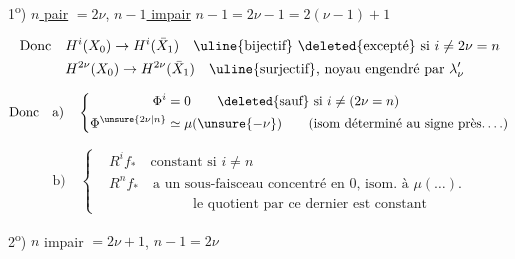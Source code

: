 1\textsuperscript{o}) \uline{$n$ pair} $=2\nu$, \uline{$n-1$ impair} \qquad $n-1=2\nu-1=2(\nu-1)+1$

\diagram{$\left.\begin{array}{ll}
 H^*(X_0):&1,\xi_0,\ldots,\xi_0^{\nu-1},[\xi_0^\nu,\lambda'_\nu],\frac12\xi_0^{\nu+1},\ldots\frac12\xi_0^{2\nu-1}\\[4pt]
 H^*(\bar X_1):&1,\xi_1\ldots,\xi_1^{\nu-1},\frac12\xi_1^\nu,\frac12\xi_1^{\nu+1},\ldots,\frac12\xi_1^{2\nu-1}
 \end{array}\right]\quad\begin{array}{l}\xi_0\leadsto\xi_1\\ \lambda'_\nu\leadsto0\end{array}$}

\[
\begin{aligned}
\text{Donc}\quad & H^i(X_0)\to H^i(\bar X_1)\quad\text{\uline{bijectif} \deleted{excepté} si }i\ne2\nu=n\\
& H^{2\nu}(X_0)\to H^{2\nu}(\bar X_1)\quad\text{\uline{surjectif}, noyau engendré par }\lambda'_\nu
\end{aligned}
\]

\[
\text{Donc}\quad\text{a)}\quad
\left\{\begin{aligned}
\Phi^{i}&=0\qquad \text{\deleted{sauf} si }i\ne(2\nu=n)\\
\Phi^{\unsure{2\nu|n}}&\simeq\mu(\unsure{-\nu})\qquad\text{(isom déterminé au signe près\ldots.)}
\end{aligned}\right.
\]

\[
\text{b)}\quad\left\{\begin{aligned}
&R^i f_*\quad\text{constant si }i\ne n\\
&R^n f_*\quad\text{a un sous-faisceau concentré en $0$, isom. à $\mu(\ldots)$.}\\
&\hspace{6em}\text{le quotient par ce dernier est constant}
\end{aligned}\right.
\]


2\textsuperscript{o}) $n$ impair $=2\nu+1$, \qquad $n-1=2\nu$

\diagram{$\left.\begin{array}{ll}
H^*(X_0):&1,\xi_0,\ \ ,\xi_0^{\nu-1},\xi_0^\nu,\frac12\xi_0^{\nu+1},\ldots\frac12\xi_0^{2\nu}\\[4pt]
H^*(\bar X_1):&1,\xi_1,\ldots\xi_1^{\nu-1},[\xi_1^\nu,\lambda_\nu],\frac12\unsure{\xi_1|\{_1}^{\nu+1},\ldots,\frac12\xi_1^{2\nu}
\end{array}\right]\quad\xi_0\leadsto\xi_1$}


